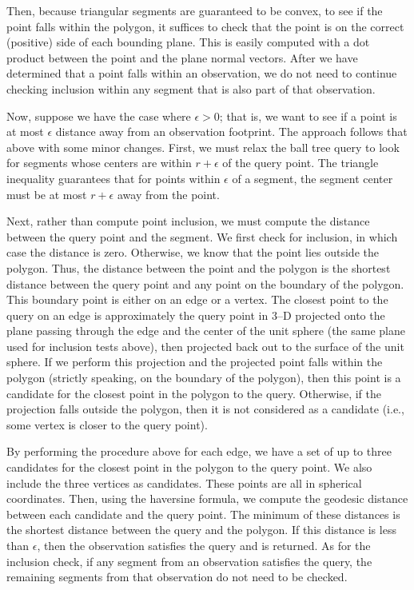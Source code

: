 \documentclass[twocolumn]{extarticle}
\begin{document}
Then, because triangular segments are guaranteed to be convex, to see
if the point falls within the polygon, it suffices to check that the point is on
the correct (positive) side of each bounding plane. This is easily computed with
a dot product between the point and the plane normal vectors. After we have
determined that a point falls within an observation, we do not need to continue
checking inclusion within any segment that is also part of that observation.

Now, suppose we have the case where $\epsilon > 0$; that is, we want to see if a
point is at most $\epsilon$ distance away from an observation footprint. The
approach follows that above with some minor changes. First, we must relax the
ball tree query to look for segments whose centers are within $r + \epsilon$ of
the query point. The triangle inequality guarantees that for points within
$\epsilon$ of a segment, the segment center must be at most $r + \epsilon$ away
from the point.

Next, rather than compute point inclusion, we must compute the distance between
the query point and the segment. We first check for inclusion, in which case
the distance is zero. Otherwise, we know that the point lies outside the
polygon. Thus, the distance between the point and the polygon is the shortest
distance between the query point and any point on the boundary of the polygon.
This boundary point is either on an edge or a vertex. The closest point to the
query on an edge is approximately the query point in 3--D projected onto the
plane passing through the edge and the center of the unit sphere (the same plane
used for inclusion tests above), then projected back out to the surface of the
unit sphere. If we perform this projection and the projected point falls within
the polygon (strictly speaking, on the boundary of the polygon), then this point
is a candidate for the closest point in the polygon to the query. Otherwise, if
the projection falls outside the polygon, then it is not considered as a
candidate (i.e., some vertex is closer to the query point).

By performing the procedure above for each edge, we have a set of up to three
candidates for the closest point in the polygon to the query point. We also
include the three vertices as candidates. These points are all in spherical
coordinates. Then, using the haversine formula, we compute the geodesic distance
between each candidate and the query point. The minimum of these distances is
the shortest distance between the query and the polygon. If this distance is
less than $\epsilon$, then the observation satisfies the query and is returned.
As for the inclusion check, if any segment from an observation satisfies the
query, the remaining segments from that observation do not need to be checked.
\end{document}
